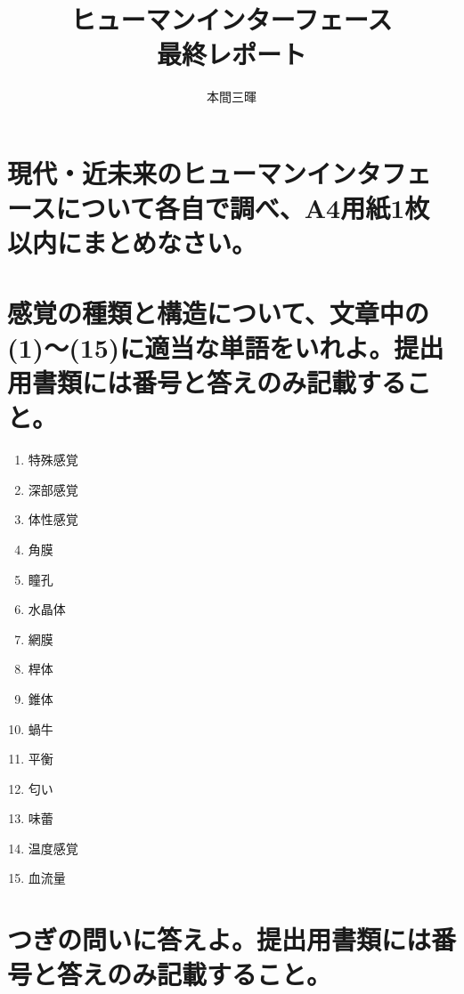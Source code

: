 \documentclass[titlepage,a4paper]{jsarticle}
\title{ヒューマンインターフェース\\最終レポート}
\author{本間三暉}
\begin{document}
\maketitle
\section{現代・近未来のヒューマンインタフェースについて各自で調べ、A4用紙1枚 以内にまとめなさい。}%
\section{感覚の種類と構造について、文章中の(1)〜(15)に適当な単語をいれよ。提出用書類には番号と答えのみ記載すること。}%
\begin{enumerate}
  \item 特殊感覚
  \item 深部感覚
  \item 体性感覚
  \item 角膜
  \item 瞳孔
  \item 水晶体
  \item 網膜
  \item 桿体
  \item 錐体
  \item 蝸牛
  \item 平衡
  \item 匂い
  \item 味蕾
  \item 温度感覚
  \item 血流量
\end{enumerate}

\section{つぎの問いに答えよ。提出用書類には番号と答えのみ記載すること。}%

\end{document}
